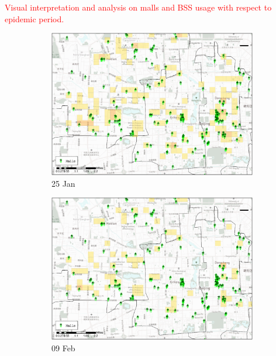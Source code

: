 \documentclass[preprints,ijgi,submit,moreauthors]{Definitions/mdpi}
\begin{document}
\textcolor{red}{Visual interpretation and analysis on malls and BSS usage with respect to epidemic period.}
\begin{figure}[H]
    \centering
    \begin{subfigure}{.23\textwidth}
        \includegraphics[width=\textwidth]{Figures/Relation_with_POIs/POI_mallsD2020_01_25.eps}
        \caption{25 Jan}
    \end{subfigure}
    \begin{subfigure}{.23\textwidth}
        \includegraphics[width=\textwidth]{Figures/Relation_with_POIs/POI_mallsD2020_02_09.eps}
        \caption{09 Feb}
    \end{subfigure}
    \begin{subfigure}{.23\textwidth}

\end{subfigure}
\end{figure}
\end{document}
